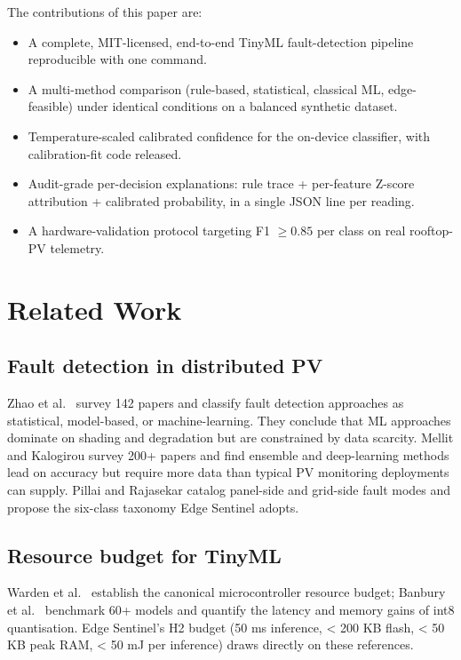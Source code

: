 \documentclass[12pt,journal,onecolumn]{IEEEtran}
\begin{document}
The contributions of this paper are:
\begin{itemize}
  \item A complete, MIT-licensed, end-to-end TinyML fault-detection
        pipeline reproducible with one command.
  \item A multi-method comparison (rule-based, statistical, classical ML,
        edge-feasible) under identical conditions on a balanced
        synthetic dataset.
  \item Temperature-scaled calibrated confidence for the on-device
        classifier, with calibration-fit code released.
  \item Audit-grade per-decision explanations: rule trace + per-feature
        Z-score attribution + calibrated probability, in a single JSON
        line per reading.
  \item A hardware-validation protocol targeting F1 $\geq 0.85$ per
        class on real rooftop-PV telemetry.
\end{itemize}

\section{Related Work}
\label{sec:related}

\subsection{Fault detection in distributed PV}

Zhao et al.\ \cite{zhao2023fault} survey 142 papers and classify fault
detection approaches as statistical, model-based, or machine-learning.
They conclude that ML approaches dominate on shading and degradation but
are constrained by data scarcity. Mellit and Kalogirou
\cite{mellit2021ai} survey 200+ papers and find ensemble and deep-learning
methods lead on accuracy but require more data than typical PV monitoring
deployments can supply. Pillai and Rajasekar
\cite{pillai2022comprehensive} catalog panel-side and grid-side fault
modes and propose the six-class taxonomy Edge Sentinel adopts.

\subsection{Resource budget for TinyML}

Warden et al.\ \cite{warden2020tinyml} establish the canonical
microcontroller resource budget; Banbury et al.\
\cite{banbury2021benchmarking} benchmark 60+ models and quantify the
latency and memory gains of int8 quantisation. Edge Sentinel's H2 budget
(50 ms inference, < 200 KB flash, < 50 KB peak RAM, < 50 mJ per
inference) draws directly on these references.
\end{document}
